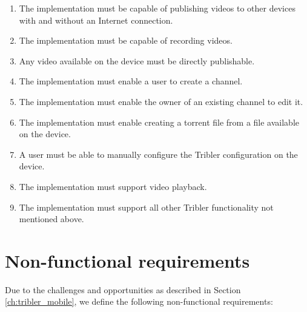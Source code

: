 \begin{enumerate}[label=A\arabic*.,ref=req. A\arabic*]
	
	\item The implementation must be capable of publishing videos to other devices with and without an Internet connection.
	\item The implementation must be capable of recording videos.
	\item Any video available on the device must be directly publishable. %
	\item The implementation must enable a user to create a channel.
	\item The implementation must enable the owner of an existing channel to edit it.
	\item The implementation must enable creating a torrent file from a file available on the device.
	\item A user must be able to manually configure the Tribler configuration on the device.
	\item The implementation must support video playback.
	\item The implementation must support all other Tribler functionality not mentioned above.
	
\end{enumerate}


\section{Non-functional requirements}

Due to the challenges and opportunities as described in Section \ref{ch:tribler_mobile}, we define the following non-functional requirements:

